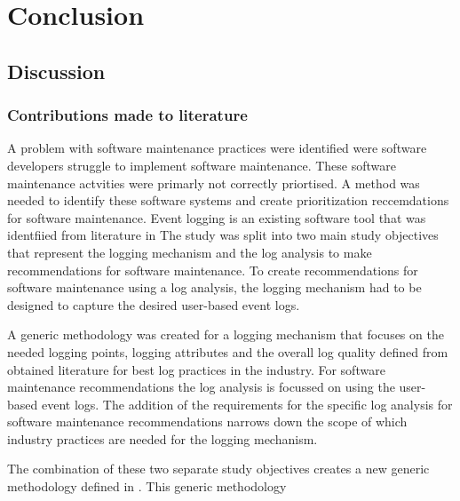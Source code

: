 \chapter{Conclusion}
\label{chap:4}

\section{Discussion}

\subsection{Contributions made to literature}
A problem with software maintenance practices were identified were software developers struggle to implement software maintenance. These software maintenance actvities were primarly not correctly priortised. A method was needed to identify these software systems and create prioritization reccemdations for software maintenance. Event logging is an existing software tool that was identfiied from literature in 
The study was split into two main study objectives that represent the logging mechanism and the log analysis to make recommendations for software maintenance. To create recommendations for software maintenance using a log analysis, the logging mechanism had to be designed to capture the desired user-based event logs. \par A generic methodology was created for a logging mechanism that focuses on the needed logging points, logging attributes and the overall log quality defined from obtained literature for best log practices in the industry. For software maintenance recommendations the log analysis is focussed on using the user-based event logs. The addition of the requirements for the specific log analysis for software maintenance recommendations narrows down the scope of which industry practices are needed for the logging mechanism.\par The combination of these two separate study objectives creates a new generic methodology defined in . This generic methodology 

